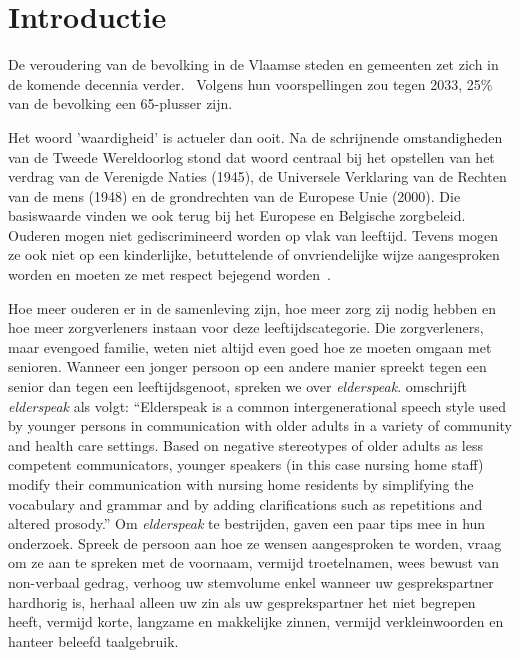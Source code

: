 

\section{Introductie}\label{sec:introductie} %

De veroudering van de bevolking in de Vlaamse steden en gemeenten zet zich in de komende  decennia verder.~\autocite{StatistiekVlaanderen2018}
Volgens hun voorspellingen zou tegen 2033, 25\% van de bevolking een 65-plusser zijn.

Het woord 'waardigheid' is actueler dan ooit.
Na de schrijnende omstandigheden van de Tweede Wereldoorlog stond dat woord centraal bij het opstellen van het verdrag van de Verenigde Naties (1945), de Universele Verklaring van de Rechten van de mens (1948) en de grondrechten van de Europese Unie (2000).
Die basiswaarde vinden we ook terug bij het Europese en Belgische zorgbeleid. Ouderen mogen niet gediscrimineerd worden op vlak van leeftijd. Tevens mogen ze ook niet op een kinderlijke, betuttelende of onvriendelijke wijze aangesproken worden en moeten ze met respect bejegend worden~\autocite{Campens}.

Hoe meer ouderen er in de samenleving zijn, hoe meer zorg zij nodig hebben en hoe meer zorgverleners instaan voor deze leeftijdscategorie.
Die zorgverleners, maar evengoed familie, weten niet altijd even goed hoe ze moeten omgaan met senioren.
Wanneer een jonger persoon op een andere manier spreekt tegen een senior dan tegen een leeftijdsgenoot, spreken we over \textit{elderspeak}. \textcite{Williams2011} omschrijft \textit{elderspeak} als volgt: ``Elderspeak is a common intergenerational speech style used by younger persons in communication with older adults in a variety of community and health care settings. Based on negative stereotypes of older adults as less competent communicators, younger speakers (in this case nursing home staff) modify their communication with nursing home residents by simplifying the vocabulary and grammar and by adding clarifications such as repetitions and altered prosody.'' Om \textit{elderspeak} te bestrijden, gaven \textcite{Wick2007} een paar tips mee in hun onderzoek.
Spreek de persoon aan hoe ze wensen aangesproken te worden, vraag om ze aan te spreken met de voornaam, vermijd troetelnamen, wees bewust van non-verbaal gedrag, verhoog uw stemvolume enkel wanneer uw gesprekspartner hardhorig is, herhaal alleen uw zin als uw gesprekspartner het niet begrepen heeft, vermijd korte, langzame en makkelijke zinnen, vermijd verkleinwoorden en hanteer beleefd taalgebruik.

